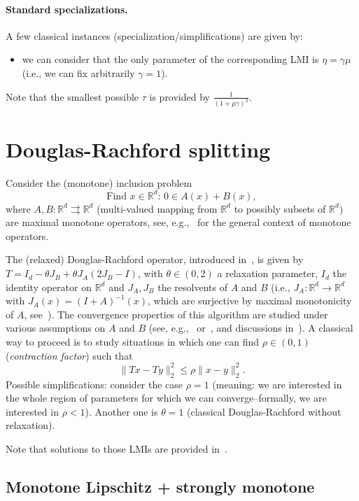 \documentclass{article}
\renewcommand{\leq}{\leqslant}
\begin{document}
\paragraph{Standard specializations.} A few classical instances (specialization/simplifications) are given by:
\begin{itemize}
	\item we can consider that the only parameter of the corresponding LMI is $\eta=\gamma\mu$ (i.e., we can fix arbitrarily $\gamma=1$).
\end{itemize}
Note that the smallest possible $\tau$ is provided by $\frac{1}{(1+\mu\gamma)^2}$.
\section{Douglas-Rachford splitting}

Consider the (monotone) inclusion problem  
\[ \text{Find } {x\in\mathbb{R}^d}:\, 0\in A(x)+B(x),\]
where $A,B:\mathbb{R}^d\rightrightarrows \mathbb{R}^d$ (multi-valued mapping from $\mathbb{R}^d$ to possibly subsets of $\mathbb{R}^d$) are maximal monotone operators, see, e.g.,~\cite{bauschke2017} for the general context of monotone operators.




The (relaxed) Douglas-Rachford operator, introduced in~\cite{douglas1956numerical}, is given by $T=I_d-\theta J_B+\theta J_A(2J_B-I)$, with $\theta\in (0,2)$ a relaxation parameter, $I_d$ the identity operator on $\mathbb{R}^d$ and $J_A, J_B$ the resolvents of $A$ and $B$ (i.e., $J_A:\mathbb{R}^d\rightarrow \mathbb{R}^d$ with $J_A(x)=(I+A)^{-1}(x)$, which are surjective by maximal monotonicity of $A$, see~\cite{minty1962monotone}). The convergence properties of this algorithm are studied under various assumptions on $A$ and $B$ (see, e.g.,~\cite{giselsson2017tight} or~\cite{moursi2019douglas}, and discussions in~\cite{ryu2020operator}). A classical way to proceed is to study situations in which one can find $\rho\in(0,1)$ (\emph{contraction factor}) such that
\[ \|Tx-Ty\|_2^2\leq \rho \|x-y\|_2^2.\]
Possible simplifications: consider the case $\rho=1$ (meaning: we are interested in the whole region of parameters for which we can converge--formally, we are interested in $\rho<1$). Another one is $\theta=1$ (classical Douglas-Rachford without relaxation).

Note that solutions to those LMIs are provided in~\cite[Section 4]{ryu2020operator}.
\subsection{Monotone Lipschitz + strongly monotone}
\end{document}
